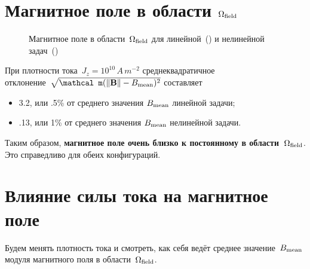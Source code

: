 \clearpage

\section{Магнитное поле в области $\OmegaField$}

\begin{figure}[h]
	\centering
	\begin{subfigure}{.49\linewidth}
		\centering
	\end{subfigure}%
	\hfill
	\begin{subfigure}{.49\linewidth}
		\centering
	\end{subfigure}%
	\par\bigskip
	\begin{subfigure}{.49\linewidth}
		\centering
		\caption{}
		\label{fig:b_field:linear}
	\end{subfigure}%
	\hfill
	\begin{subfigure}{.49\linewidth}
		\centering
		\caption{}
		\label{fig:b_field:nonlinear}
	\end{subfigure}
	\caption[Магнитное поле в области~$\OmegaField$ для линейной и нелинейной задач]{
		Магнитное поле в области~$\OmegaField$ для линейной~() и нелинейной задач~()
	}
	\label{fig:b_field}
\end{figure}

При плотности тока~${J_z = 10^{10}\,A\,m^{-2}}$ среднеквадратичное \\ отклонение~$\sqrt{\mathcal m(\norm{\vect B} - \BMean)^2}$ составляет
\begin{itemize}
	\item 3.2, или .5\% от среднего значения ${B_{\text{mean}}}$ линейной задачи;
	\item .13, или 1\% от среднего значения ${B_{\text{mean}}}$ нелинейной задачи.
\end{itemize}

Таким образом, \textbf{магнитное поле очень близко к постоянному в области~$\OmegaField$}. Это справедливо для обеих конфигураций.  

\section{Влияние силы тока на магнитное поле}

Будем менять плотность тока и смотреть, как себя ведёт среднее значение~${B_{\text{mean}}}$ модуля магнитного поля в области~$\OmegaField$.

